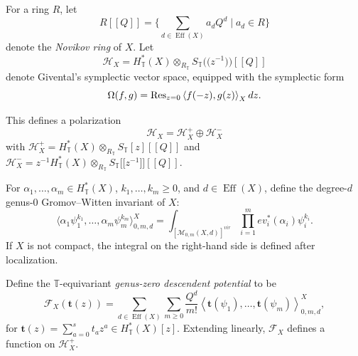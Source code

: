 \documentclass[11pt]{article}
\numberwithin{equation}{section}
\numberwithin{equation}{section}
\newcommand{\cc}[1]{\mathcal{#1}} %
\newcommand{\bt}{{\bm{t}}}
\newcommand{\torus}{\mathbb{T}}
\DeclareMathOperator{\eff}{Eff}
\newcommand{\br}[1]{\left\langle#1\right\rangle} %
\newcommand{\op}[1]{\operatorname{#1}}
\begin{document}
For a ring $R$, let
\[
R[\![Q]\!] = \biggl\{ \sum_{d\in \eff(X)} a_d Q^d \mid a_d \in R \biggr\}
\]
denote the \emph{Novikov ring} of $X$.
Let
\[
\cc H_X = H^*_\torus(X) \otimes_{R_\torus} S_\torus\bigl(\!\bigl(z^{-1}\bigr)\!\bigr)[\![Q]\!]
\]
denote Givental's symplectic vector space, equipped with the symplectic form
\begin{equation*}%
\Omega(f, g) = \op{Res}_{z = 0}\br{f(-z), g(z)}_X {\rm d}z.
\end{equation*}


This defines a polarization
\[
\cc H_X = \cc H_X^+ \oplus \cc H_X^-
\]
with $\cc H_X^+ = H^*_\torus(X) \otimes_{R_\torus} S_\torus[z][\![Q]\!]$ and
$\cc H_X^- = z^{-1} H^*_\torus(X) \otimes_{R_\torus} S_\torus \bigl[\!\bigl[z^{-1}\bigr]\!\bigr] [\![Q]\!]$.

For $\alpha_1, \dots, \alpha_m \in H^*_\torus(X)$, $k_1, \dots, k_m \geq 0$, and $d \in \eff(X)$, define the degree-$d$ genus-0 Gromov--Witten invariant of $X$:
\[
\big\langle\alpha_1 \psi_1^{k_1}, \dots, \alpha_m \psi_m^{k_m}\bigr\rangle_{0, m ,d}^X = \int_{[\cc M_{0, m}(X, d)]^{vir}} \prod_{i=1}^m ev_i^*(\alpha_i) \psi_i^{k_i}.
\]
If $X$ is not compact, the integral on the right-hand side is defined after localization.
\begin{Definition}
Define the $\torus$-equivariant \emph{genus-zero descendent potential} to be
\begin{equation*}
\cc F_X(\bt(z)) = \sum_{d \in \eff(X)} \sum_{m \geq 0} \frac{Q^d}{m!} \br{\bt(\psi_1), \dots, \bt(\psi_m)}_{0, m, d}^X,
\end{equation*}
for $\bt(z) = \sum_{a=0}^s t_a z^a \in H^*_\torus(X)[z]$. Extending linearly, $\cc F_X$ defines a function on $\cc H_X^+$.
\end{Definition}
\end{document}
